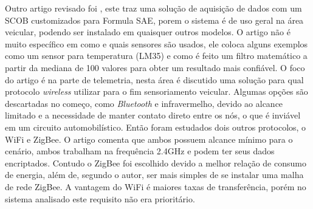 Outro artigo revisado foi \cite{vehicleDataAcquisition2014}, este traz uma solução de aquisição de dados com um SCOB customizados para Formula SAE, porem o sistema é de uso geral na área veicular, podendo ser instalado em quaisquer outros modelos. O artigo não é muito específico em como e quais sensores são usados, ele coloca alguns exemplos como um sensor para temperatura (LM35) e como é feito um filtro matemático a partir da mediana de 100 valores para obter um resultado mais confiável. O foco do artigo é na parte de telemetria, nesta área é discutido uma solução para qual protocolo \textit{wireless} utilizar para o fim sensoriamento veicular. Algumas opções são descartadas no começo, como \textit{Bluetooth} e infravermelho, devido ao alcance limitado e a necessidade de manter contato direto entre os nós, o que é inviável em um circuito automobilístico. Então foram estudados dois outros protocolos, o WiFi e ZigBee. O artigo comenta que ambos possuem alcance mínimo para o cenário, ambos trabalham na frequência 2.4GHz e podem ter seus dados encriptados. Contudo o ZigBee foi escolhido devido a melhor relação de consumo de energia, além de, segundo o autor, ser mais simples de se instalar uma malha de rede ZigBee. A vantagem do WiFi é maiores taxas de transferência, porém no sistema analisado este requisito não era prioritário.         



